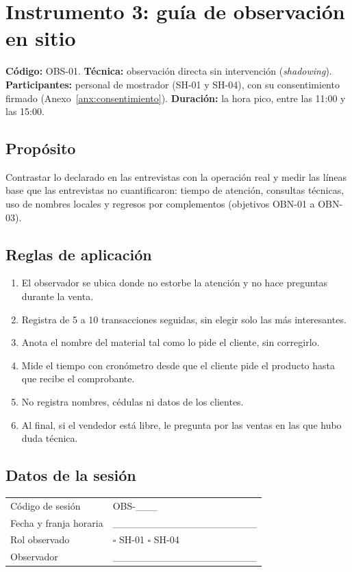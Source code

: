 \section{Instrumento 3: guía de observación en sitio}\label{anx:observacion}

\textbf{Código:} OBS-01. \textbf{Técnica:} observación directa sin intervención (\emph{shadowing}). \textbf{Participantes:} personal de mostrador (SH-01 y SH-04), con su consentimiento firmado (Anexo~\ref{anx:consentimiento}). \textbf{Duración:} la hora pico, entre las 11:00 y las 15:00.

\subsection*{Propósito}
Contrastar lo declarado en las entrevistas con la operación real y medir las líneas base que las entrevistas no cuantificaron: tiempo de atención, consultas técnicas, uso de nombres locales y regresos por complementos (objetivos OBN-01 a OBN-03).

\subsection*{Reglas de aplicación}
\begin{enumerate}[label=\arabic*., leftmargin=*]
\item El observador se ubica donde no estorbe la atención y no hace preguntas durante la venta.
\item Registra de 5 a 10 transacciones seguidas, sin elegir solo las más interesantes.
\item Anota el nombre del material tal como lo pide el cliente, sin corregirlo.
\item Mide el tiempo con cronómetro desde que el cliente pide el producto hasta que recibe el comprobante.
\item No registra nombres, cédulas ni datos de los clientes.
\item Al final, si el vendedor está libre, le pregunta por las ventas en las que hubo duda técnica.
\end{enumerate}

\subsection*{Datos de la sesión}
\begin{tabularx}{\textwidth}{@{}L{5cm}X@{}}
\toprule
Código de sesión & OBS-\_\_\_ \\
Fecha y franja horaria & \_\_\_\_\_\_\_\_\_\_\_\_\_\_\_\_\_\_\_\_ \\
Rol observado & $\square$ SH-01 \quad $\square$ SH-04 \\
Observador & \_\_\_\_\_\_\_\_\_\_\_\_\_\_\_\_\_\_\_\_ \\
\bottomrule
\end{tabularx}

